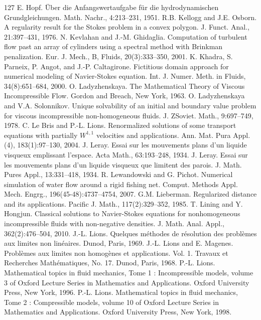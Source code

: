 \begin{thebibliography}{127}
 E. Hopf. Über die Anfangswertaufgabe für die hydrodynamischen Grundgleichungen. Math. Nachr., 4:213–231, 1951.
 R.B. Kellogg and J.E. Osborn. A regularity result for the Stokes problem in a convex polygon. J. Funct. Anal., 21:397–431, 1976.
 N. Kevlahan and J.-M. Ghidaglia. Computation of turbulent flow past an array of cylinders using a spectral method with Brinkman penalization. Eur. J. Mech., B, Fluids, 20(3):333–350, 2001.
 K. Khadra, S. Parneix, P. Angot, and J.-P. Caltagirone. Fictitious domain approach for numerical modeling of Navier-Stokes equation. Int. J. Numer. Meth. in Fluids, 34(8):651–684, 2000.
 O. Ladyzhenskaya. The Mathematical Theory of Viscous Incompressible Flow. Gordon and Breach, New York, 1963.
 O. Ladyzhenskaya and V.A. Solonnikov. Unique solvability of an initial and boundary value problem for viscous incompressible non-homogeneous fluids. J. ZSoviet. Math., 9:697–749, 1978.
 C. Le Bris and P.-L. Lions. Renormalized solutions of some transport equations with partially $W^{1,1}$ velocities and applications. Ann. Mat. Pura Appl. (4), 183(1):97–130, 2004.
 J. Leray. Essai sur les mouvements plans d’un liquide visqueux emplissant l’espace. Acta Math., 63:193–248, 1934.
 J. Leray. Essai sur les mouvements plans d’un liquide visqueux que limitent des parois. J. Math. Pures Appl., 13:331–418, 1934.
 R. Lewandowski and G. Pichot. Numerical simulation of water flow around a rigid fishing net. Comput. Methods Appl. Mech. Engrg., 196(45-48):4737–4754, 2007.
 G.M. Lieberman. Regularized distance and its applications. Pacific J. Math., 117(2):329–352, 1985.
 T. Lining and Y. Hongjun. Classical solutions to Navier-Stokes equations for nonhomogeneous incompressible fluids with non-negative densities. J. Math. Anal. Appl., 362(2):476–504, 2010.
 J.-L. Lions. Quelques méthodes de résolution des problèmes aux limites non linéaires. Dunod, Paris, 1969.
 J.-L. Lions and E. Magenes. Problèmes aux limites non homogènes et applications. Vol. 1. Travaux et Recherches Mathématiques, No. 17. Dunod, Paris, 1968.
 P.-L. Lions. Mathematical topics in fluid mechanics, Tome 1 : Incompressible models, volume 3 of Oxford Lecture Series in Mathematics and Applications. Oxford University Press, New York, 1996.
 P.-L. Lions. Mathematical topics in fluid mechanics, Tome 2 : Compressible models, volume 10 of Oxford Lecture Series in Mathematics and Applications. Oxford University Press, New York, 1998.

\end{thebibliography}
